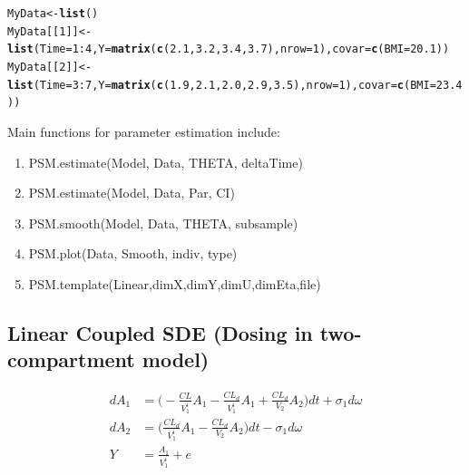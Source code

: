 \documentclass[a4paper,11pt]{article}\usepackage[]{graphicx}\usepackage[]{color}
\makeatletter
\newcommand{\hlnum}[1]{\textcolor[rgb]{0.686,0.059,0.569}{#1}}%
\newcommand{\hlopt}[1]{\textcolor[rgb]{0,0,0}{#1}}%
\newcommand{\hlstd}[1]{\textcolor[rgb]{0.345,0.345,0.345}{#1}}%
\newcommand{\hlkwb}[1]{\textcolor[rgb]{0.69,0.353,0.396}{#1}}%
\newcommand{\hlkwc}[1]{\textcolor[rgb]{0.333,0.667,0.333}{#1}}%
\newcommand{\hlkwd}[1]{\textcolor[rgb]{0.737,0.353,0.396}{\textbf{#1}}}%
\newenvironment{kframe}{%
 \def\at@end@of@kframe{}%
 \ifinner\ifhmode%
  \def\at@end@of@kframe{\end{minipage}}%
  \begin{minipage}{\columnwidth}%
 \fi\fi%
 \def\FrameCommand##1{\hskip\@totalleftmargin \hskip-\fboxsep
 \colorbox{shadecolor}{##1}\hskip-\fboxsep
     \hskip-\linewidth \hskip-\@totalleftmargin \hskip\columnwidth}%
 \MakeFramed {\advance\hsize-\width
   \@totalleftmargin\z@ \linewidth\hsize
   \@setminipage}}%
 {\par\unskip\endMakeFramed%
 \at@end@of@kframe}
\newenvironment{knitrout}{}{} %
\makeatother
\begin{document}
\begin{knitrout}
\color{fgcolor}\begin{kframe}
\begin{alltt}
\hlstd{MyData} \hlkwb{<-} \hlkwd{list}\hlstd{()}
\hlstd{MyData[[}\hlnum{1}\hlstd{]]} \hlkwb{<-} \hlkwd{list}\hlstd{(}\hlkwc{Time}\hlstd{=}\hlnum{1}\hlopt{:}\hlnum{4}\hlstd{,}\hlkwc{Y}\hlstd{=}\hlkwd{matrix}\hlstd{(}\hlkwd{c}\hlstd{(}\hlnum{2.1}\hlstd{,}\hlnum{3.2}\hlstd{,}\hlnum{3.4}\hlstd{,}\hlnum{3.7}\hlstd{),}\hlkwc{nrow}\hlstd{=}\hlnum{1}\hlstd{),}\hlkwc{covar}\hlstd{=}\hlkwd{c}\hlstd{(}\hlkwc{BMI}\hlstd{=}\hlnum{20.1}\hlstd{))}
\hlstd{MyData[[}\hlnum{2}\hlstd{]]} \hlkwb{<-} \hlkwd{list}\hlstd{(}\hlkwc{Time}\hlstd{=}\hlnum{3}\hlopt{:}\hlnum{7}\hlstd{,}\hlkwc{Y}\hlstd{=}\hlkwd{matrix}\hlstd{(}\hlkwd{c}\hlstd{(}\hlnum{1.9}\hlstd{,}\hlnum{2.1}\hlstd{,}\hlnum{2.0}\hlstd{,}\hlnum{2.9}\hlstd{,}\hlnum{3.5}\hlstd{),}\hlkwc{nrow}\hlstd{=}\hlnum{1}\hlstd{),}\hlkwc{covar}\hlstd{=}\hlkwd{c}\hlstd{(}\hlkwc{BMI}\hlstd{=}\hlnum{23.4}\hlstd{))}
\end{alltt}
\end{kframe}
\end{knitrout}

Main functions for parameter estimation include:
\begin{enumerate}
\item PSM.estimate(Model, Data, THETA, deltaTime)
\item PSM.estimate(Model, Data, Par, CI)
\item PSM.smooth(Model, Data, THETA, subsample)
\item PSM.plot(Data, Smooth, indiv, type)
\item PSM.template(Linear,dimX,dimY,dimU,dimEta,file)
\end{enumerate}

\subsection{Linear Coupled SDE (Dosing in two-compartment model)}
\begin{align*}
dA_1 & = \Bigg( - \frac{CL}{V_1^i}A_1 - \frac{CL_d}{V_1^i}A_1 + \frac{CL_d}{V_2}A_2\Bigg) dt + \sigma_1 d\omega \\
dA_2 & = \Bigg( \frac{CL_d}{V_1^i}A_1 - \frac{CL_d}{V_2}A_2\Bigg)dt - \sigma_1 d \omega \\
Y & = \frac{A_1}{V_1^i} + e
\end{align*}
\end{document}
